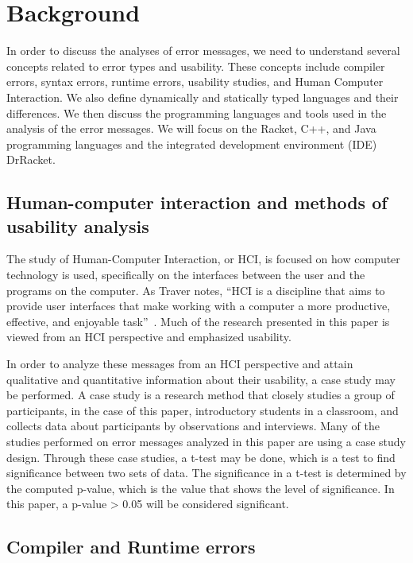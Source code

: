 \documentclass{sig-alternate}
\begin{document}
\section{Background}\label{sec:background}
In order to discuss the analyses of error messages, we need to understand several concepts related to error types and usability.
These concepts include compiler errors, syntax errors, runtime errors, usability studies, and Human Computer Interaction.
We also define dynamically and statically typed languages and their differences.
We then discuss the programming languages and tools used in the analysis of the error messages.
We will focus on the Racket, C++, and Java programming languages and the integrated development environment (IDE) DrRacket.


\subsection{Human-computer interaction and methods of usability analysis}\label{subsec:hci}

The study of Human-Computer Interaction, or HCI, is focused on how computer technology is used, specifically on the interfaces between the user and the programs on the computer.
As Traver notes, ``HCI is a discipline that aims to provide user interfaces that make working with a computer a more productive, effective, and enjoyable task''~\cite{Traver:2010}.
Much of the research presented in this paper is viewed from an HCI perspective and emphasized usability.

In order to analyze these messages from an HCI perspective and attain qualitative and quantitative information about their usability, a case study may be performed.
A case study is a research method that closely studies a group of participants, in the case of this paper, introductory students in a classroom, and collects data about participants by observations and interviews. 
Many of the studies performed on error messages analyzed in this paper are using a case study design.
Through these case studies, a t-test may be done, which is a test to find significance between two sets of data.
The significance in a t-test is determined by the computed p-value, which is the value that shows the level of significance.
In this paper, a p-value > 0.05 will be considered significant.

\subsection{Compiler and Runtime errors}\label{subsec:error types}
\end{document}
